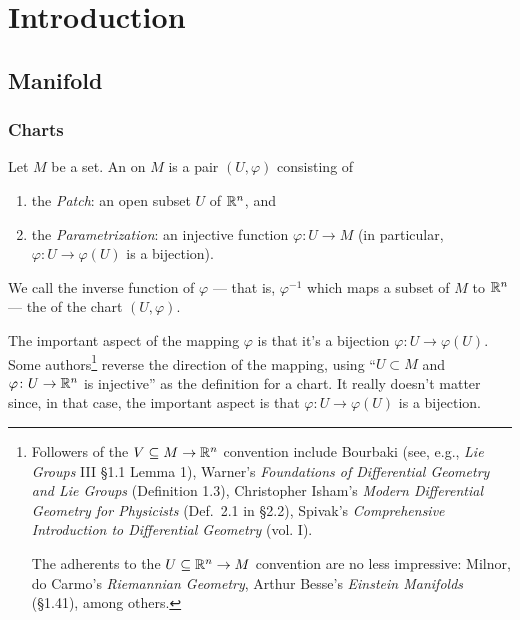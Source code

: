 \section{Introduction}
\subsection{Manifold}
\subsubsection{Charts}

\begin{definition}
Let $M$ be a set. An  on $M$
is a pair $(U,\varphi)$ consisting of
\begin{enumerate}
\item the \emph{Patch}: an open subset $U$ of $\mathbb{R}^{n}$, and
\item the \emph{Parametrization}: an injective function $\varphi\colon U\to M$
  (in particular, $\varphi\colon U\to \varphi(U)$ is a bijection).
\end{enumerate}
\end{definition}

\begin{remark}
We call the inverse function of $\varphi$ --- that is, $\varphi^{-1}$
which maps a subset of $M$ to $\mathbb{R}^{n}$ --- the 
of the chart $(U,\varphi)$.
\end{remark}

\begin{remark}
The important aspect of the mapping $\varphi$ is that it's a bijection
$\varphi\colon U\to\varphi(U)$. Some authors\footnote{Followers of the
$V\subseteq M\to\mathbb{R}^{n}$ convention include Bourbaki (see, e.g., \textit{Lie Groups} III \S1.1 Lemma 1),
Warner's \textit{Foundations of Differential Geometry and Lie Groups} 
(Definition 1.3), Christopher Isham's
\textit{Modern Differential Geometry for Physicists} (Def.~2.1 in \S2.2),
Spivak's \textit{Comprehensive Introduction to Differential Geometry} (vol. I).

The adherents to the $U\subseteq\mathbb{R}^{n}\to M$ convention are no less
impressive: Milnor, do Carmo's \textit{Riemannian Geometry}, Arthur Besse's
\textit{Einstein Manifolds} (\S1.41), among others.}
reverse the direction of the mapping, using ``$U\subset M$ and
$\varphi\colon U\to\mathbb{R}^{n}$ is injective'' as the definition for a
chart. It really doesn't matter since, in that case, the important
aspect is that $\varphi\colon U\to\varphi(U)$ is a bijection.
\end{remark}


